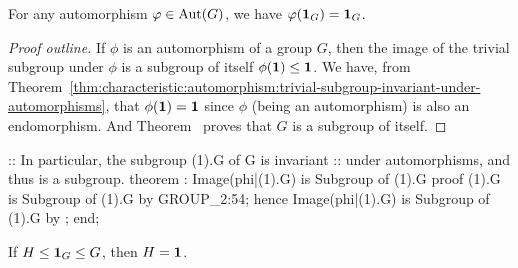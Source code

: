 \begin{theorem}
For any automorphism $\varphi\in\operatorname{Aut}(G)$, we have $\varphi(\mathbf{1}_{G})=\mathbf{1}_{G}$.
\end{theorem}

\begin{proof}[Proof outline]
If $\phi$ is an automorphism of a group $G$, then
the image of the trivial subgroup under $\phi$ is a subgroup of itself
$\phi(\mathbf{1})\leq\mathbf{1}$. We have, from
Theorem~\ref{thm:characteristic:automorphism:trivial-subgroup-invariant-under-automorphisms}, that $\phi(\mathbf{1})=\mathbf{1}$ since
$\phi$ (being an automorphism) is also an endomorphism. And
Theorem~
proves that $G$ is a subgroup of itself.
\end{proof}

\nwenddocs{}\endmoddef\nwstartdeflinemarkup{}\nwenddeflinemarkup
:: In particular, the   subgroup (1).G of G is invariant
:: under  automorphisms, and thus is a  subgroup.
theorem :
  Image(phi|(1).G) is Subgroup of (1).G
proof
  (1).G is Subgroup of (1).G by GROUP_2:54;
  hence Image(phi|(1).G) is Subgroup of (1).G by ;
end;
\eatline
{}\nwendcode{}\nwdocspar
\begin{lemma}
If $H\leq\mathbf{1}_{G}\leq G$, then $H=\mathbf{1}$.
\end{lemma}

